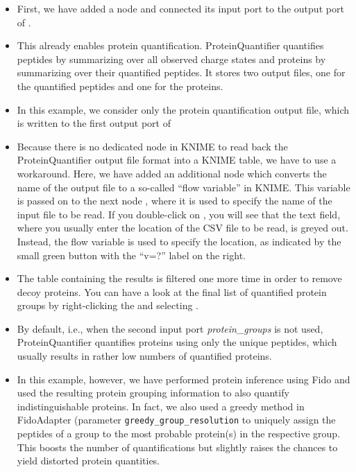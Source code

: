 \begin{itemize}
\item First, we have added a  node and connected its input port to the output port of .
\item This already enables protein quantification. ProteinQuantifier quantifies peptides by summarizing over all observed charge states and proteins
by summarizing over their quantified peptides. It stores two output files, one for the quantified peptides and one for the proteins.
\item In this example, we consider only the protein quantification output file, which is written to the first output port of 
\item Because there is no dedicated node in KNIME to read back the ProteinQuantifier output file format into a KNIME table, we have to use a workaround.
Here, we have added an additional
 node which converts the name of the output file to a so-called ``flow variable'' in KNIME. This variable is passed on
to the next node , where it is used to specify the name of the input file to be read. If you double-click on ,
you will see that the text field, where you usually enter the location of the CSV file to be read, is greyed out. Instead, the flow variable is used
to specify the location, as indicated by the small green button with the ``v=?'' label on the right.
\item The table containing the  results is filtered one more time in order to remove decoy proteins. You can have a look
at the final list of quantified protein groups by right-clicking the  and selecting .
\item By default, i.e., when the second input port \textit{protein\_groups} is not used, ProteinQuantifier quantifies 
proteins using only the unique peptides,
which usually results in rather low numbers of quantified proteins.
\item In this example, however, we have performed protein inference using Fido and used the resulting protein 
grouping information to also quantify
indistinguishable proteins. In fact, we also used a greedy method in FidoAdapter (parameter 
\texttt{greedy\_group\_resolution} to uniquely assign the peptides of a group to the most probable protein(s) in the 
respective group. This boosts the number of quantifications but slightly raises the chances to yield distorted protein quantities.

\end{itemize}
